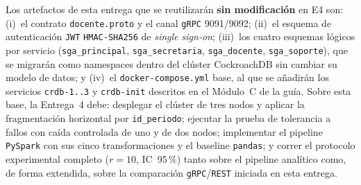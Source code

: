 \documentclass[12pt,a4paper]{article}
\begin{document}
Los artefactos de esta entrega que se reutilizarán \textbf{sin
modificación} en E4 son: (i)~el contrato \texttt{docente.proto} y el canal
\texttt{gRPC} 9091/9092; (ii)~el esquema de autenticación \texttt{JWT}
\texttt{HMAC-SHA256} de \emph{single sign-on}; (iii)~los cuatro esquemas
lógicos por servicio (\texttt{sga\_principal}, \texttt{sga\_secretaria},
\texttt{sga\_docente}, \texttt{sga\_soporte}), que se migrarán como
namespaces dentro del clúster CockroachDB sin cambiar su modelo de datos;
y (iv)~el \texttt{docker-compose.yml} base, al que se añadirán los
servicios \texttt{crdb-1..3} y \texttt{crdb-init} descritos en el Módulo~C
de la guía. Sobre esta base, la Entrega~4 debe: desplegar el clúster de
tres nodos y aplicar la fragmentación horizontal por \texttt{id\_periodo};
ejecutar la prueba de tolerancia a fallos con caída controlada de uno y de
dos nodos; implementar el pipeline \texttt{PySpark} con sus cinco
transformaciones y el baseline \texttt{pandas}; y correr el protocolo
experimental completo ($r=10$, IC~95\,\%) tanto sobre el pipeline analítico
como, de forma extendida, sobre la comparación \texttt{gRPC}/\texttt{REST}
iniciada en esta entrega.



\end{document}
